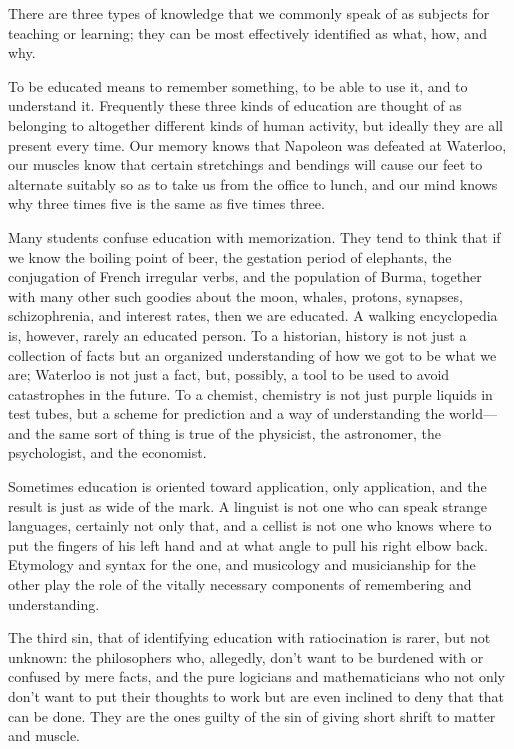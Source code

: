 \documentclass[a4paper,12pt]{article}
\begin{document}
There are three types of knowledge that we commonly speak of as subjects
for teaching or learning; they can be most effectively identified as what,
how, and why.

To be educated means to remember something, to be able to use it, and to
understand it.  Frequently these three kinds of education are thought of as
belonging to altogether different kinds of human activity, but ideally they
are all present every time.  Our memory knows that Napoleon was defeated at
Waterloo, our muscles know that certain stretchings and bendings will cause
our feet to alternate suitably so as to take us from the office to lunch,
and our mind knows why three times five is the same as five times three.

Many students confuse education with memorization.  They tend to think
that if we know the boiling point of beer, the gestation period of
elephants, the conjugation of French irregular verbs, and the population
of Burma, together with many other such goodies about the moon, whales,
protons, synapses, schizophrenia, and interest rates, then we are
educated.  A walking encyclopedia is, however, rarely an educated person.
To a historian, history is not just a collection of facts but an organized
understanding of how we got to be what we are; Waterloo is not just a
fact, but, possibly, a tool to be used to avoid catastrophes in the
future.  To a chemist, chemistry is not just purple liquids in test tubes,
but a scheme for prediction and a way of understanding the world—and the
same sort of thing is true of the physicist, the astronomer, the
psychologist, and the economist.

Sometimes education is oriented toward application, only application, and
the result is just as wide of the mark.  A linguist is not one who can
speak strange languages, certainly not only that, and a cellist is not one
who knows where to put the fingers of his left hand and at what angle to
pull his right elbow back.  Etymology and syntax for the one, and
musicology and musicianship for the other play the role of the vitally
necessary components of remembering and understanding.

The third sin, that of identifying education with ratiocination is
rarer, but not unknown: the philosophers who, allegedly, don’t want to
be burdened with or confused by mere facts, and the pure logicians and
mathematicians who not only don’t want to put their thoughts to work but
are even inclined to deny that that can be done.  They are the ones
guilty of the sin of giving short shrift to matter and muscle.
\end{document}
